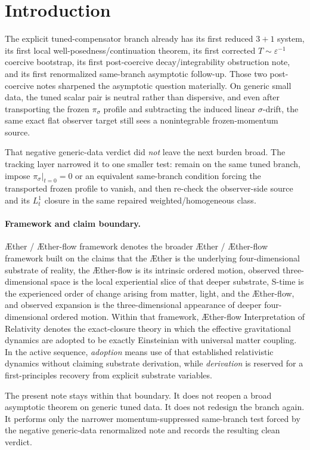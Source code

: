 \documentclass[11pt]{article}
\newcommand{\Aether}{\AE{}ther}
\newcommand{\Aflow}{\AE{}ther-flow}
\newcommand{\TheoryName}{\Aflow{} Interpretation of Relativity}
\newcommand{\TheoryProgram}{\Aether{} / \Aflow{} framework}
\begin{document}
\section{Introduction}

The explicit tuned-compensator branch already has its first reduced \(3+1\) system, its first local well-posedness/continuation theorem, its first corrected \(T\sim\varepsilon^{-1}\) coercive bootstrap, its first post-coercive decay/integrability obstruction note, and its first renormalized same-branch asymptotic follow-up. Those two post-coercive notes sharpened the asymptotic question materially. On generic small data, the tuned scalar pair is neutral rather than dispersive, and even after transporting the frozen \(\pi_\sigma\) profile and subtracting the induced linear \(\sigma\)-drift, the same exact flat observer target still sees a nonintegrable frozen-momentum source.

That negative generic-data verdict did \emph{not} leave the next burden broad. The tracking layer narrowed it to one smaller test: remain on the same tuned branch, impose \(\pi_\sigma|_{t=0}=0\) or an equivalent same-branch condition forcing the transported frozen profile to vanish, and then re-check the observer-side source and its \(L_t^1\) closure in the same repaired weighted/homogeneous class.

\paragraph{Framework and claim boundary.}
\TheoryProgram{} denotes the broader \Aether{} / \Aflow{} framework built on the claims that the \Aether{} is the underlying four-dimensional substrate of reality, the \Aflow{} is its intrinsic ordered motion, observed three-dimensional space is the local experiential slice of that deeper substrate, S-time is the experienced order of change arising from matter, light, and the \Aflow{}, and observed expansion is the three-dimensional appearance of deeper four-dimensional ordered motion. Within that framework, \TheoryName{} denotes the exact-closure theory in which the effective gravitational dynamics are adopted to be exactly Einsteinian with universal matter coupling. In the active sequence, \emph{adoption} means use of that established relativistic dynamics without claiming substrate derivation, while \emph{derivation} is reserved for a first-principles recovery from explicit substrate variables.

The present note stays within that boundary. It does not reopen a broad asymptotic theorem on generic tuned data. It does not redesign the branch again. It performs only the narrower momentum-suppressed same-branch test forced by the negative generic-data renormalized note and records the resulting clean verdict.
\end{document}

